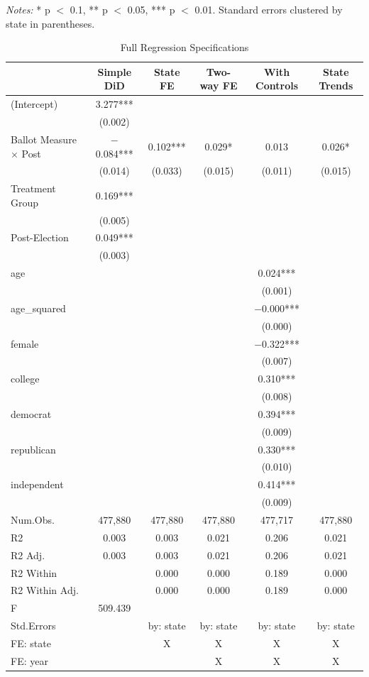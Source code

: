 \documentclass[12pt,letterpaper,oneside]{book}
\begin{document}
\begin{table}[H]
\centering
\caption{Full Regression Specifications}
\label{tab:full_specs}
\begin{singlespace}
{\footnotesize \textit{Notes:} * p $<$ 0.1, ** p $<$ 0.05, *** p $<$ 0.01. Standard errors clustered by state in parentheses.}
\end{singlespace}
\vspace{0.5em}
\small
\begin{tabular}{lccccc}
\toprule
& Simple DiD & State FE & Two-way FE & With Controls & State Trends \\ \midrule
(Intercept) & 3.277*** &  &  &  &  \\
& (0.002) &  &  &  &  \\
Ballot Measure $\times$ Post & $-$0.084*** & 0.102*** & 0.029* & 0.013 & 0.026* \\
& (0.014) & (0.033) & (0.015) & (0.011) & (0.015) \\
Treatment Group & 0.169*** &  &  &  &  \\
& (0.005) &  &  &  &  \\
Post-Election & 0.049*** &  &  &  &  \\
& (0.003) &  &  &  &  \\
age &  &  &  & 0.024*** &  \\
&  &  &  & (0.001) &  \\
age\_squared &  &  &  & $-$0.000*** &  \\
&  &  &  & (0.000) &  \\
female &  &  &  & $-$0.322*** &  \\
&  &  &  & (0.007) &  \\
college &  &  &  & 0.310*** &  \\
&  &  &  & (0.008) &  \\
democrat &  &  &  & 0.394*** &  \\
&  &  &  & (0.009) &  \\
republican &  &  &  & 0.330*** &  \\
&  &  &  & (0.010) &  \\
independent &  &  &  & 0.414*** &  \\
&  &  &  & (0.009) &  \\ \midrule
Num.Obs. & 477,880 & 477,880 & 477,880 & 477,717 & 477,880 \\
R2 & 0.003 & 0.003 & 0.021 & 0.206 & 0.021 \\
R2 Adj. & 0.003 & 0.003 & 0.021 & 0.206 & 0.021 \\
R2 Within &  & 0.000 & 0.000 & 0.189 & 0.000 \\
R2 Within Adj. &  & 0.000 & 0.000 & 0.189 & 0.000 \\
F & 509.439 &  &  &  &  \\
Std.Errors &  & by: state & by: state & by: state & by: state \\
FE: state &  & X & X & X & X \\
FE: year &  &  & X & X & X \\
\bottomrule
\end{tabular}
\end{table}
\end{document}
